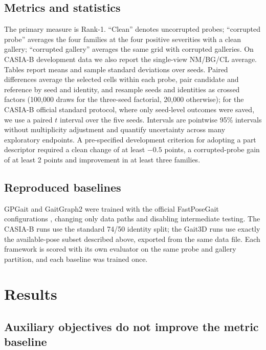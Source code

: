 \documentclass[review,12pt]{elsarticle}
\begin{document}
\subsection{Metrics and statistics}

The primary measure is Rank-1. ``Clean'' denotes uncorrupted probes;
``corrupted probe'' averages the four families at the four positive severities
with a clean gallery; ``corrupted gallery'' averages the same grid with
corrupted galleries. On CASIA-B development data we also report the
single-view NM/BG/CL average. Tables report means and sample standard
deviations over seeds. Paired differences average the selected cells within
each probe, pair candidate and reference by seed and identity, and resample
seeds and identities as crossed factors (100,000 draws for the three-seed
factorial, 20,000 otherwise); for the CASIA-B official standard protocol, where
only seed-level outcomes were saved, we use a paired $t$ interval over the five
seeds. Intervals are pointwise 95\% intervals without multiplicity adjustment
and quantify uncertainty across many exploratory endpoints. A pre-specified development criterion for adopting a
part descriptor required a clean change of at least $-0.5$ points, a
corrupted-probe gain of at least 2 points and improvement in at least three
families.

\subsection{Reproduced baselines}

GPGait \cite{fu2023gpgait} and GaitGraph2 \cite{teepe2022gaitgraph2} were
trained with the official FastPoseGait configurations
\cite{meng2023fastposegait}, changing only data paths and disabling
intermediate testing. The CASIA-B runs use the standard 74/50 identity split;
the Gait3D runs use exactly the available-pose subset described above,
exported from the same data file. Each framework is scored with its own
evaluator on the same probe and gallery partition, and each baseline was
trained once.

\section{Results}
\label{sec:results}

\subsection{Auxiliary objectives do not improve the metric baseline}
\end{document}
